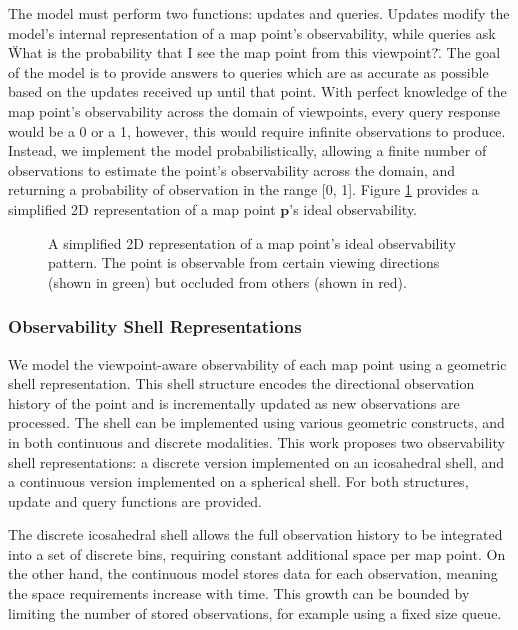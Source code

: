 
The model must perform two functions: updates and queries. Updates modify the model's internal representation of a map point's observability, while queries ask \"What is the probability that I see the map point from this viewpoint?\". The goal of the model is to provide answers to queries which are as accurate as possible based on the updates received up until that point. With perfect knowledge of the map point's observability across the domain of viewpoints, every query response would be a 0 or a 1, however, this would require infinite observations to produce. Instead, we implement the model probabilistically, allowing a finite number of observations to estimate the point's observability across the domain, and returning a probability of observation in the range [0, 1]. Figure \ref{fig:2d_observability} provides a simplified 2D representation of a map point $\boldsymbol{p}$'s ideal observability.

\begin{figure}[htbp]
    \centering
    \caption{A simplified 2D representation of a map point's ideal observability pattern. The point is observable from certain viewing directions (shown in green) but occluded from others (shown in red).}
    \label{fig:2d_observability}
\end{figure}

\subsubsection{Observability Shell Representations}

We model the viewpoint-aware observability of each map point using a geometric shell representation. This shell structure encodes the directional observation history of the point and is incrementally updated as new observations are processed. The shell can be implemented using various geometric constructs, and in both continuous and discrete modalities. This work proposes two observability shell representations: a discrete version implemented on an icosahedral shell, and a continuous version implemented on a spherical shell. For both structures, update and query functions are provided.

The discrete icosahedral shell allows the full observation history to be integrated into a set of discrete bins, requiring constant additional space per map point. On the other hand, the continuous model stores data for each observation, meaning the space requirements increase with time. This growth can be bounded by limiting the number of stored observations, for example using a fixed size queue.

